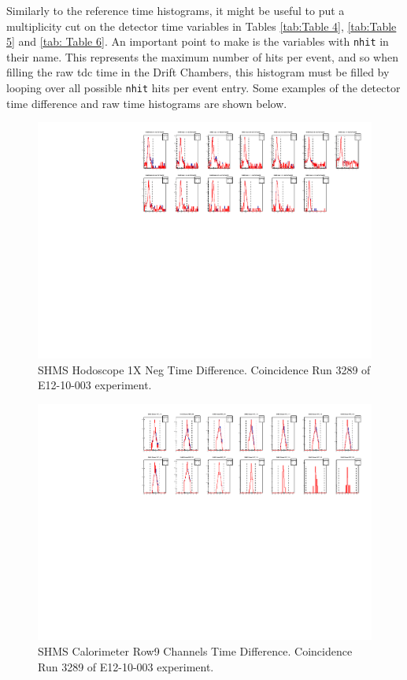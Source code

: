 \documentclass[14pt]{article}
\begin{document}
\indent Similarly to the reference time histograms, it might be useful to put a multiplicity cut on the detector time variables in Tables \ref{tab:Table 4}, \ref{tab:Table 5} and
\ref{tab: Table 6}. An important point to make is the variables with \texttt{nhit} in their name. This represents the maximum number of hits per event, and so when filling
the raw tdc time in the Drift Chambers, this histogram must be filled by looping over all possible \texttt{nhit} hits per event entry. Some examples of the detector time
difference and raw time histograms are shown below.
\begin{figure}[H]
  \captionsetup{justification=raggedright,singlelinecheck=false}
  \includegraphics[scale=0.95]{plots/pHodo_1xGoodNeg.pdf}
  \caption{SHMS Hodoscope 1X Neg Time Difference. Coincidence Run 3289 of E12-10-003 experiment.}
  \label{fig:shms_hodo_difftime}
\end{figure}
\begin{figure}[H]
  \captionsetup{justification=raggedright,singlelinecheck=false}
  \includegraphics[scale=0.95]{plots/pCal_Row9.pdf}
  \caption{SHMS Calorimeter Row9 Channels Time Difference. Coincidence Run 3289 of E12-10-003 experiment.}
  \label{fig:shms_cal_difftime}
\end{figure}
\end{document}
